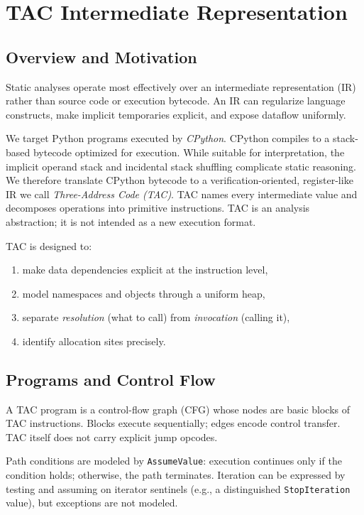 \newpage
\section{TAC Intermediate Representation}
\label{sec:appendix-tac-ir}

\subsection{Overview and Motivation}

Static analyses operate most effectively over an intermediate representation (IR) rather than source code or execution bytecode. An IR can regularize language constructs, make implicit temporaries explicit, and expose dataflow uniformly.

We target Python programs executed by \emph{CPython}. CPython compiles to a stack-based bytecode optimized for execution. While suitable for interpretation, the implicit operand stack and incidental stack shuffling complicate static reasoning. We therefore translate CPython bytecode to a verification-oriented, register-like IR we call \emph{Three-Address Code (TAC)}. TAC names every intermediate value and decomposes operations into primitive instructions. TAC is an analysis abstraction; it is not intended as a new execution format.

TAC is designed to:
\begin{enumerate}
\item make data dependencies explicit at the instruction level,
\item model namespaces and objects through a uniform heap,
\item separate \emph{resolution} (what to call) from \emph{invocation} (calling it),
\item identify allocation sites precisely.
\end{enumerate}

\subsection{Programs and Control Flow}

A TAC program is a control-flow graph (CFG) whose nodes are basic blocks of TAC instructions. Blocks execute sequentially; edges encode control transfer. TAC itself does not carry explicit jump opcodes.

Path conditions are modeled by \texttt{AssumeValue}: execution continues only if the condition holds; otherwise, the path terminates. Iteration can be expressed by testing and assuming on iterator sentinels (e.g., a distinguished \texttt{StopIteration} value), but exceptions are not modeled.

